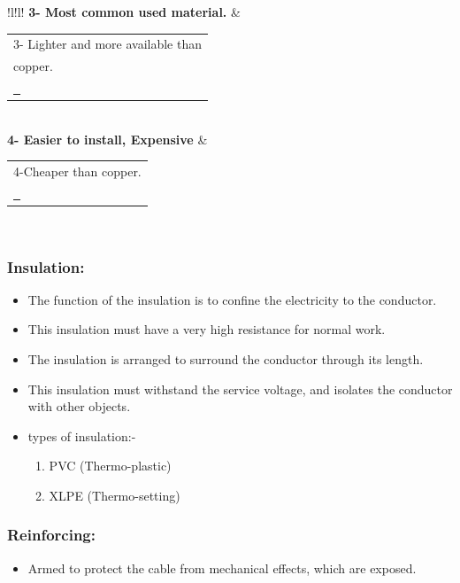 \documentclass[12pt,fleqn]{book} %
\begin{document}
\begin{table}[h!]
\begin{tabular}{!{\color[rgb]{0.584,0.702,0.843}\vrule}l!{\color{black}\vrule}l!{\color[rgb]{0.584,0.702,0.843}\vrule}}
\hline
{} \textbf{3- Most common used material.}\uline{}                                   & \begin{tabular}[c]{@{}>{\cellcolor[rgb]{0.859,0.898,0.945}}l@{}}3- Lighter and more available than \\copper. \\\textbf{\uline{~}}\end{tabular}                       \\ 
\hline
\textbf{4- Easier to install, Expensive}\uline{}                                                                   & \begin{tabular}[c]{@{}l@{}}4-Cheaper than copper. \\\textbf{\uline{~}}\end{tabular}                                                                                  \\
\hline
\end{tabular}
\end{table}
 \subsubsection{Insulation: }
 \begin{itemize}
    \item 	The function of the insulation is to confine the electricity to the conductor.
    \item This insulation must have a very high resistance for normal work.
    \item 	The insulation is arranged to surround the conductor through its length.
    \item This insulation must withstand the service voltage, and isolates the conductor with other objects.
    \item	types of insulation:-
    \begin{enumerate}
   \item  PVC (Thermo-plastic)  
    \item  XLPE (Thermo-setting)
    \end{enumerate}
    \end{itemize}
    \subsubsection{Reinforcing: }
\begin{itemize}
    \item 	Armed to protect the cable from mechanical effects, which are exposed.
\end{itemize}
\end{document}
